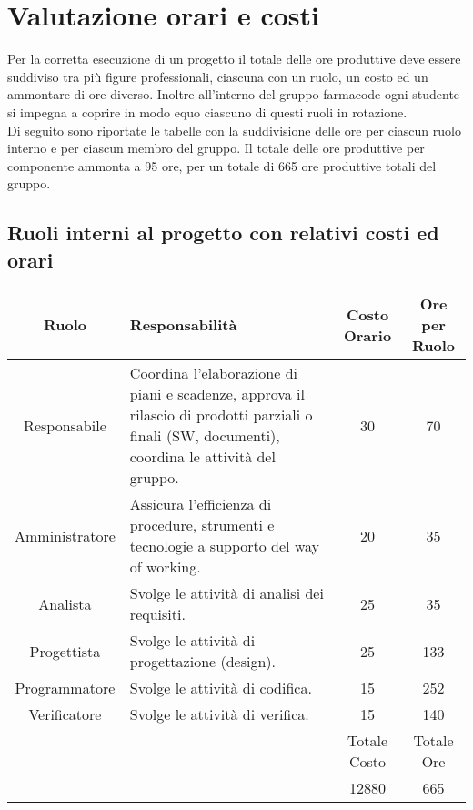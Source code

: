 \section{Valutazione orari e costi}
Per la corretta esecuzione di un progetto il totale delle ore produttive deve essere suddiviso tra più figure professionali, ciascuna con un ruolo, un costo ed un ammontare di ore diverso. Inoltre all'interno del gruppo farmacode ogni studente si impegna a coprire in modo equo ciascuno di questi ruoli in rotazione. \\
Di seguito sono riportate le tabelle con la suddivisione delle ore per ciascun ruolo interno e per ciascun membro del gruppo. Il totale delle ore produttive per componente ammonta a 95 ore, per un totale di 665 ore produttive totali del gruppo.
    
    \subsection{Ruoli interni al progetto con relativi costi ed orari}
        \setlength{\arrayrulewidth}{0.5mm}
        \setlength{\tabcolsep}{20pt}
        \renewcommand{\arraystretch}{2}
        \begin{tabular}[*{10}{t}]{|c|p{4.7cm}*{2}{|c}|}
            \hline
            Ruolo & Responsabilità & Costo Orario & Ore per Ruolo \\
            \hline
            Responsabile & Coordina l’elaborazione di piani e scadenze, approva il rilascio di prodotti parziali o finali (SW, documenti), coordina le attività del gruppo. & 30 & 70 \\
            Amministratore & Assicura l’efficienza di procedure, strumenti e tecnologie a supporto del way of working. & 20 & 35 \\
            Analista &  Svolge le attività di analisi dei requisiti. & 25 & 35 \\
            Progettista & Svolge le attività di progettazione (design). & 25 & 133 \\
            Programmatore & Svolge le attività di codifica. & 15 & 252 \\
            Verificatore & Svolge le attività di verifica. & 15 & 140 \\
            \hline
             & & Totale Costo & Totale Ore \\
             & & 12880 & 665 \\
            \hline
        \end{tabular}


